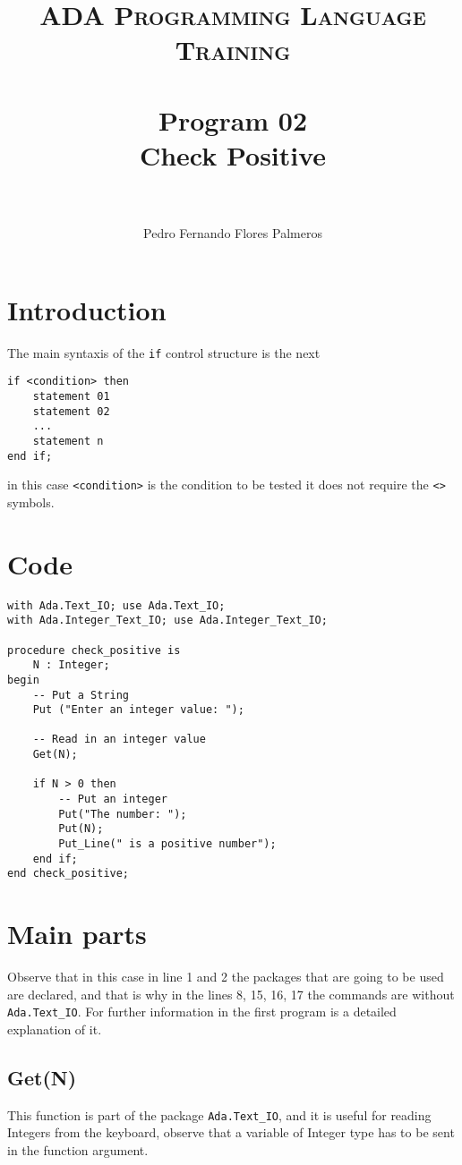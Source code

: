 \documentclass[paper=a4, fontsize=11pt]{scrartcl} %
\title{	
\normalfont \normalsize 
\textsc{ADA Programming Language Training} \\ [25pt] %
\horrule{0.5pt} \\[0.4cm] %
\huge Program 02\\ Check Positive \\ %
\horrule{2pt} \\[0.5cm] %
}
\author{Pedro Fernando Flores Palmeros} %
\date{} %
\numberwithin{equation}{section} %
\numberwithin{figure}{section} %
\numberwithin{table}{section} %
\begin{document}
\maketitle %
 

\section{Introduction}
The main syntaxis of the \verb|if| control structure is the next

\begin{lstlisting}
if <condition> then
	statement 01
	statement 02
	...
	statement n
end if;
\end{lstlisting}
in this case \verb|<condition>| is the condition to be tested it does not require the \verb|<>| symbols.

\section{Code}
\begin{lstlisting}
with Ada.Text_IO; use Ada.Text_IO;
with Ada.Integer_Text_IO; use Ada.Integer_Text_IO;

procedure check_positive is 
    N : Integer;
begin
    -- Put a String
    Put ("Enter an integer value: ");

    -- Read in an integer value
    Get(N);

    if N > 0 then
        -- Put an integer
        Put("The number: ");
        Put(N);
        Put_Line(" is a positive number");
    end if;
end check_positive;
\end{lstlisting}

\section{Main parts}
Observe that in this case in line 1 and 2 the packages that are going to be used are declared, and that is why in the lines 8, 15, 16, 17 the commands are without \verb|Ada.Text_IO|. For further information in the first program is a detailed explanation of it. 

\subsection{Get(N)}
This function is part of the package \verb|Ada.Text_IO|, and it is useful for reading Integers from the keyboard, observe that a variable of Integer type has to be sent in the function argument. 
\end{document}
